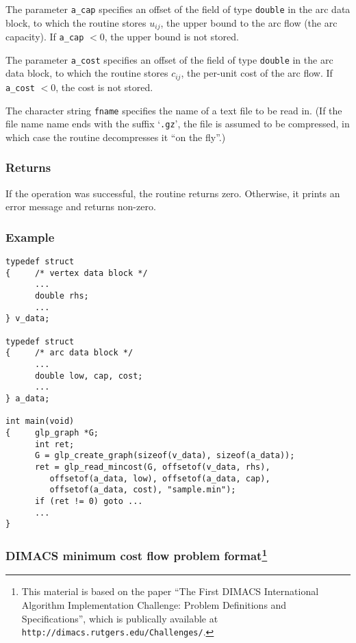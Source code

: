 \documentclass[dvipdfm,11pt]{report}
\begin{document}
The parameter \verb|a_cap| specifies an offset of the field of type
\verb|double| in the arc data block, to which the routine stores
$u_{ij}$, the upper bound to the arc flow (the arc capacity). If
\verb|a_cap| $<0$, the upper bound is not stored.

The parameter \verb|a_cost| specifies an offset of the field of type
\verb|double| in the arc data block, to which the routine stores
$c_{ij}$, the per-unit cost of the arc flow. If \verb|a_cost| $<0$, the
cost is not stored.

The character string \verb|fname| specifies the name of a text file to
be read in. (If the file name name ends with the suffix `\verb|.gz|',
the file is assumed to be compressed, in which case the routine
decompresses it ``on the fly''.)

\subsubsection*{Returns}

If the operation was successful, the routine returns zero. Otherwise,
it prints an error message and returns non-zero.

\newpage

\subsubsection*{Example}

\begin{footnotesize}
\begin{verbatim}
typedef struct
{     /* vertex data block */
      ...
      double rhs;
      ...
} v_data;

typedef struct
{     /* arc data block */
      ...
      double low, cap, cost;
      ...
} a_data;

int main(void)
{     glp_graph *G;
      int ret;
      G = glp_create_graph(sizeof(v_data), sizeof(a_data));
      ret = glp_read_mincost(G, offsetof(v_data, rhs),
         offsetof(a_data, low), offsetof(a_data, cap),
         offsetof(a_data, cost), "sample.min");
      if (ret != 0) goto ...
      ...
}
\end{verbatim}
\end{footnotesize}

\subsubsection*{DIMACS minimum cost flow problem format\footnote{This
material is based on the paper ``The First DIMACS International
Algorithm Implementation Challenge: Problem Definitions and
Specifications'', which is publically available at
{\tt http://dimacs.rutgers.edu/Challenges/}.}}
\label{subsecmincost}
\end{document}
